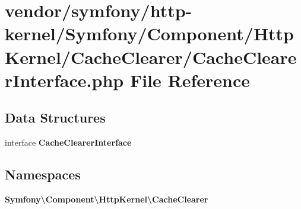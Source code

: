 \section{vendor/symfony/http-\/kernel/\+Symfony/\+Component/\+Http\+Kernel/\+Cache\+Clearer/\+Cache\+Clearer\+Interface.php File Reference}
\label{_cache_clearer_interface_8php}
\subsection*{Data Structures}
\begin{DoxyCompactItemize}
\item 
interface {\bf Cache\+Clearer\+Interface}
\end{DoxyCompactItemize}
\subsection*{Namespaces}
\begin{DoxyCompactItemize}
\item 
 {\bf Symfony\textbackslash{}\+Component\textbackslash{}\+Http\+Kernel\textbackslash{}\+Cache\+Clearer}
\end{DoxyCompactItemize}
